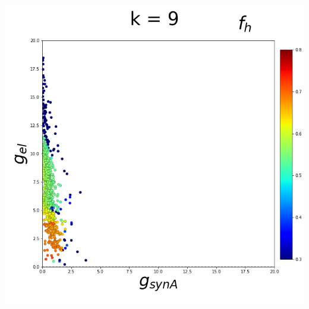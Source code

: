 \documentclass[11pt]{article}
\begin{document}
\begin{center}
\includegraphics[scale=0.125]{DSN_figs/STGCircuit_DSN_c=0_rs=3_k=9.png}
\end{center}
\end{document}
